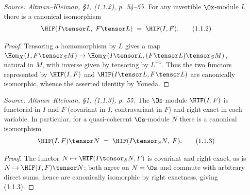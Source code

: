 \begin{lemma}
  \label{lem:H_tensor_invertible}
  \textit{Source: Altman--Kleiman, §1, (1.1.2), p. 54--55.}
  For any invertible $\Ox$-module $L$ there is a canonical isomorphism
  \[
    \HIF(I \tensor L,\; F \tensor L) \;=\; \HIF(I,F).
    \tag{1.1.2}
  \]
  \begin{proof}
    Tensoring a homomorphism by $L$ gives a map
    $\Hom_X(I, F \tensor_S M) \to \Hom_X(I \tensor L, (F \tensor L) \tensor_S M)$,
    natural in $M$, with inverse given by tensoring by $L^{-1}$. Thus the two
    functors represented by $\HIF(I,F)$ and $\HIF(I\tensor L, F \tensor L)$ are
    canonically isomorphic, whence the asserted identity by Yoneda.
  \end{proof}
\end{lemma}

\begin{lemma}
  \label{lem:H_tensor}
  \textit{Source: Altman--Kleiman, §1, (1.1.3), p. 55.}
  The $\Os$-module $\HIF(I,F)$ is functorial in $I$ and $F$ (covariant in $I$,
  contravariant in $F$) and right exact in each variable. In particular, for a
  quasi-coherent $\Os$-module $N$ there is a canonical isomorphism
  \[
    \HIF(I,F) \tensor N \;=\; \HIF(I \tensor_S N,\; F).
    \tag{1.1.3}
  \]
  \begin{proof}
    The functor $N \mapsto \HIF(I \tensor_S N, F)$ is covariant and right exact,
    as is $N \mapsto \HIF(I,F) \tensor N$; both agree on $N = \Os$ and commute
    with arbitrary direct sums, hence are canonically isomorphic by right
    exactness, giving \textnormal{(1.1.3)}.
  \end{proof}
\end{lemma}

